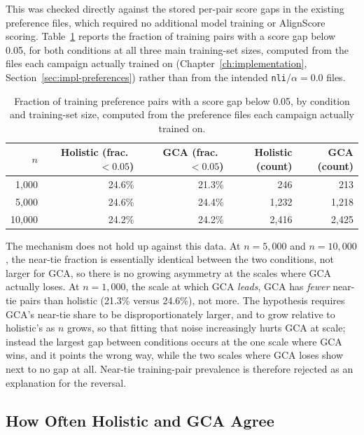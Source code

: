 This was checked directly against the stored per-pair score gaps in the
existing preference files, which required no additional model training or
AlignScore scoring. Table~\ref{tab:near-tie} reports the fraction of
training pairs with a score gap below 0.05, for both conditions at all three
main training-set sizes, computed from the files each campaign
actually trained on (Chapter~\ref{ch:implementation},
Section~\ref{sec:impl-preferences}) rather than from the intended
\texttt{nli}/$\alpha=0.0$ files.

\begin{table}[htbp]
\centering
\caption[Near-tie training-pair fraction, holistic vs.\ GCA]{Fraction of training preference pairs with a score gap below 0.05,
by condition and training-set size, computed from the preference files each
campaign actually trained on.}
\label{tab:near-tie}
\begin{tabular}{rrrrr}
\toprule
$n$ & Holistic (frac.\ $<0.05$) & GCA (frac.\ $<0.05$) & Holistic (count) & GCA (count) \\
\midrule
1{,}000  & 24.6\% & 21.3\% & 246 & 213 \\
5{,}000  & 24.6\% & 24.4\% & 1{,}232 & 1{,}218 \\
10{,}000 & 24.2\% & 24.2\% & 2{,}416 & 2{,}425 \\
\bottomrule
\end{tabular}
\end{table}

The mechanism does not hold up against this data. At $n=5{,}000$ and
$n=10{,}000$, the near-tie fraction is essentially identical between the two
conditions, not larger for GCA, so there is no growing asymmetry at the
scales where GCA actually loses. At $n=1{,}000$, the scale at which GCA
\emph{leads}, GCA has \emph{fewer} near-tie pairs than holistic (21.3\%
versus 24.6\%), not more. The hypothesis requires GCA's near-tie share to
be disproportionately larger, and to grow relative to holistic's as $n$
grows, so that fitting that noise increasingly hurts GCA at scale; instead
the largest gap between conditions occurs at the one scale where GCA wins,
and it points the wrong way, while the two scales where GCA loses show
next to no gap at all. Near-tie training-pair prevalence is therefore
rejected as an explanation for the reversal.

\subsection{How Often Holistic and GCA Agree}
\label{sec:results-label-agreement}

